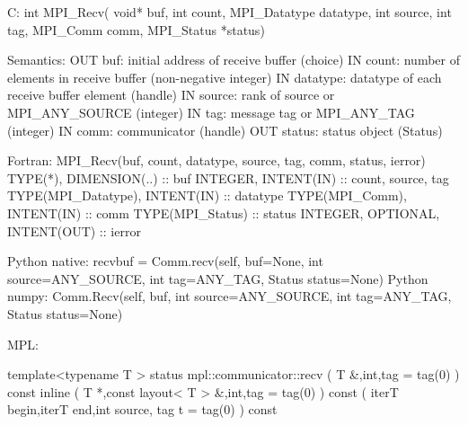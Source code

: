 C:
int MPI_Recv(
  void* buf, int count, MPI_Datatype datatype,
  int source, int tag, MPI_Comm comm, MPI_Status *status)

Semantics:
OUT buf: initial address of receive buffer (choice)
IN count: number of elements in receive buffer (non-negative integer)
IN datatype: datatype of each receive buffer element (handle)
IN source: rank of source or MPI_ANY_SOURCE (integer)
IN tag: message tag or MPI_ANY_TAG (integer)
IN comm: communicator (handle)
OUT status: status object (Status)

Fortran:
MPI_Recv(buf, count, datatype, source, tag, comm, status, ierror)
TYPE(*), DIMENSION(..) :: buf
INTEGER, INTENT(IN) :: count, source, tag
TYPE(MPI_Datatype), INTENT(IN) :: datatype
TYPE(MPI_Comm), INTENT(IN) :: comm
TYPE(MPI_Status) :: status
INTEGER, OPTIONAL, INTENT(OUT) :: ierror

Python native:
recvbuf = Comm.recv(self, buf=None, int source=ANY_SOURCE, int tag=ANY_TAG,
    Status status=None)
Python numpy:
Comm.Recv(self, buf, int source=ANY_SOURCE, int tag=ANY_TAG,
    Status status=None)

MPL:

template<typename T >
status mpl::communicator::recv
   ( T &,int,tag = tag(0) ) const inline
   ( T *,const layout< T > &,int,tag = tag(0) ) const
   ( iterT  begin,iterT  end,int  source, tag  t = tag(0) ) const
